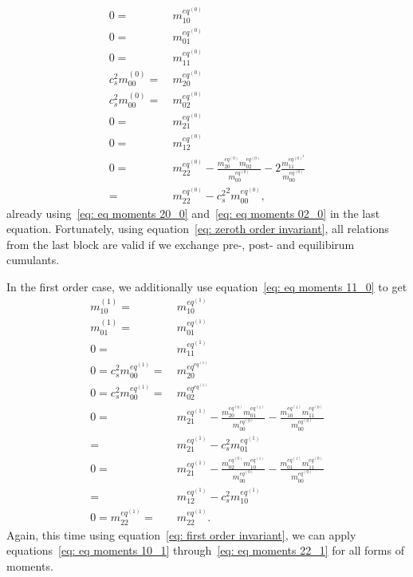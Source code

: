 \begin{align}
  \label{eq: eq moments 10_0}
  0 = &\ m_{10}^{eq^{(0)}}
  \\
  \label{eq: eq moments 01_0}
  0 = &\ m_{01}^{eq^{(0)}}
  \\
  \label{eq: eq moments 11_0}
  0 = &\ m_{11}^{eq^{(0)}}
  \\
  \label{eq: eq moments 20_0}
  c_s^2 m_{00}^{(0)} = &\ m_{20}^{eq^{(0)}}
  \\
  \label{eq: eq moments 02_0}
  c_s^2 m_{00}^{(0)} = &\ m_{02}^{eq^{(0)}}
  \\
  \label{eq: eq moments 21_0}
  0 = &\ m_{21}^{eq^{(0)}}
  \\
  \label{eq: eq moments 12_0}
  0 = &\ m_{12}^{eq^{(0)}}
  \\
  \label{eq: eq moments 22_0}
  0 = &\ m_{22}^{eq^{(0)}} - \frac{ m_{20}^{eq^{(0)}} m_{02}^{eq^{(0)}} }{m_{00}^{eq^{(0)}}} - 2\frac{ m_{11}^{eq^{{(0)}^2}}}{m_{00}^{eq^{(0)}}}
  \\ = &\ m_{22}^{eq^{(0)}} - {c_s^2}^2 m_{00}^{eq^{(0)}},
\end{align}
already using~\eqref{eq: eq moments 20_0} and~\eqref{eq: eq moments 02_0} in the last equation.
Fortunately, using equation~\eqref{eq: zeroth order invariant}, all relations from the last block are valid if we exchange pre-, post- and equilibirum cumulants.

In the first order case, we additionally use equation~\eqref{eq: eq moments 11_0} to get
\begin{align}
  \label{eq: eq moments 10_1}
  m_{10}^{(1)} = &\ m_{10}^{eq^{(1)}}
  \\
  \label{eq: eq moments 01_1}
  m_{01}^{(1)} = &\ m_{01}^{eq^{(1)}}
  \\
  \label{eq: eq moments 11_1}
  0 = &\ m_{11}^{eq^{(1)}}
  \\
  \label{eq: eq moments 20_1}
  0 = c_s^2 m_{00}^{eq^{(1)}} = &\ m_{20}^{eq^{eq^{(1)}}}
  \\
  \label{eq: eq moments 02_1}
  0 = c_s^2 m_{00}^{eq^{(1)}} = &\ m_{02}^{eq^{eq^{(1)}}}
  \\\nonumber
  0 = &\ m_{21}^{eq^{(1)}}
  - \frac{m_{20}^{eq^{(0)}} m_{01}^{eq^{(1)}}}{m_{00}^{eq^{(0)}}}
  - \frac{m_{10}^{eq^{(1)}} m_{11}^{eq^{(0)}}}{m_{00}^{eq^{(0)}}}
  \\
  \label{eq: eq moments 21_1}
  = &\ m_{21}^{eq^{(1)}}
  - c_s^2 m_{01}^{eq^{(1)}}
  \\\nonumber
  0 = &\ m_{21}^{eq^{(1)}}
  - \frac{m_{02}^{eq^{(0)}} m_{10}^{eq^{(1)}}}{m_{00}^{eq^{(0)}}}
  - \frac{m_{01}^{eq^{(1)}} m_{11}^{eq^{(0)}}}{m_{00}^{eq^{(0)}}}
  \\
  \label{eq: eq moments 12_1}
  = &\ m_{12}^{eq^{(1)}}
  - c_s^2 m_{10}^{eq^{(1)}}
  \\
  \label{eq: eq moments 22_1}
  0 = m_{22}^{eq^{(1)}} =&\ m_{22}^{eq^{(1)}}.
\end{align}
Again, this time using equation~\eqref{eq: first order invariant}, we can apply equations~\eqref{eq: eq moments 10_1} through~\eqref{eq: eq moments 22_1} for all forms of moments.

